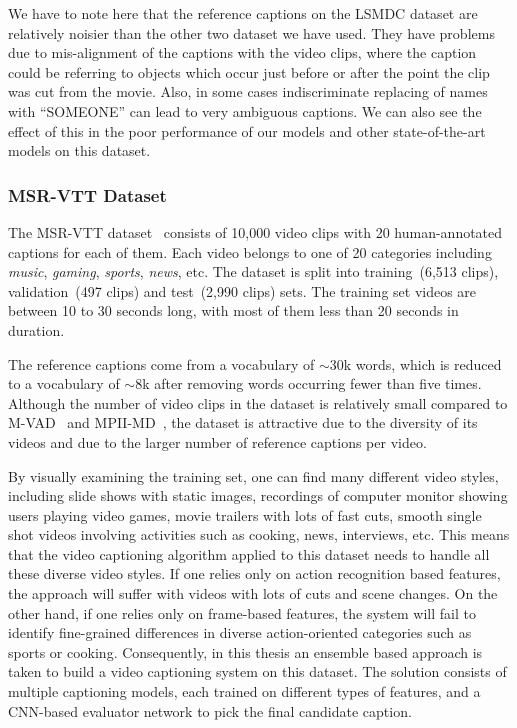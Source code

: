We have to note here that the reference captions on the LSMDC dataset are
relatively noisier than the other two dataset we have used.
They have problems due to mis-alignment of the captions with the video clips,
where the caption could be referring to objects which occur just before or after
the point the clip was cut from the movie. 
Also, in some cases indiscriminate replacing of names with ``SOMEONE'' can lead
to very ambiguous captions.
We can also see the effect of this in the poor performance of our models and
other state-of-the-art models on this dataset.

\subsubsection{MSR-VTT Dataset}
The MSR-VTT dataset~\cite{Xu:CVPR16} consists of 10,000 video clips with 20
human-annotated captions for each of them.
Each video belongs to one of 20 categories including \emph{music},
\emph{gaming}, \emph{sports}, \emph{news}, etc.
The dataset is split into training~(6,513 clips), validation~(497 clips) and
test~(2,990 clips) sets. 
The training set videos are between 10 to 30 seconds long, with most of them
less than 20 seconds in duration.

The reference captions come from a vocabulary of $\sim$30k words, which is
reduced to a vocabulary of $\sim$8k after removing words occurring fewer than
five times.
Although the number of video clips in the dataset is relatively small compared
to M-VAD~\cite{rohrbach15cvpr} and MPII-MD~\cite{AtorabiM-VAD2015}, the dataset
is attractive due to the diversity of its videos and due to the larger number of
reference captions per video.

By visually examining the training set, one can find many different video styles,
including slide shows with static images, recordings of computer monitor showing
users playing video games, movie trailers with lots of fast cuts, smooth single
shot videos involving activities such as cooking, news, interviews, etc.
This means that the video captioning algorithm applied to this dataset needs to
handle all these diverse video styles.
If one relies only on action recognition based features, the approach will suffer
with videos with lots of cuts and scene changes.
On the other hand, if one relies only on frame-based features, the system will fail
to identify fine-grained differences in diverse action-oriented categories such
as sports or cooking.
Consequently, in this thesis an ensemble based approach is taken to build a video
captioning system on this dataset.
The solution consists of multiple captioning models, each trained on different
types of features, and a CNN-based evaluator network to pick the final candidate
caption.
